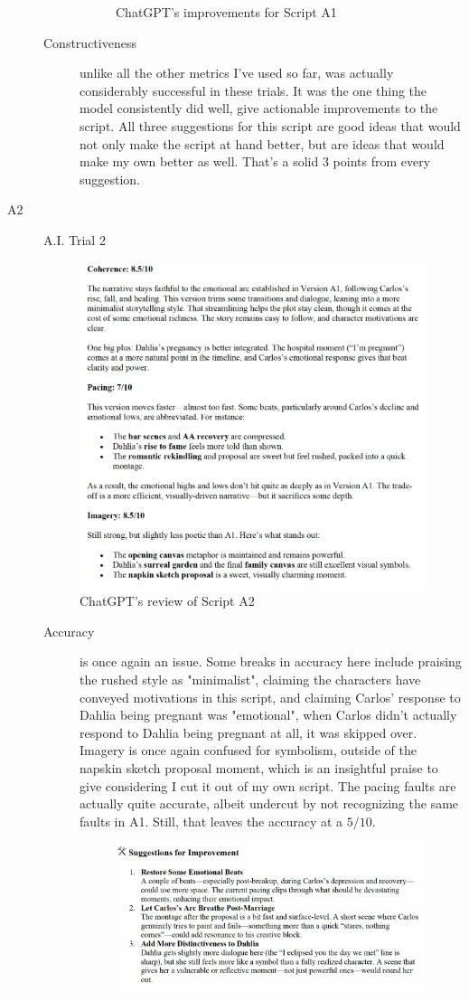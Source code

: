 \documentclass[sigconf]{acmart}
\begin{document}
\begin{description}
\begin{description}
\begin{figure}[!hbt]
            \caption{ChatGPT's improvements for Script A1}
            \label{fig:a1-improvements}
        \end{figure}
        \item[Constructiveness] unlike all the other metrics I've used so far, was actually considerably successful in these trials. It was the one thing the model consistently did well, give actionable improvements to the script. All three suggestions for this script are good ideas that would not only make the script at hand better, but are ideas that would make my own better as well. That's a solid $3$ points from every suggestion.
    \end{description}
    \item[A2] A.I. Trial 2
    \begin{figure}[!hbt]
            \centering
            \includegraphics[width=0.5\linewidth]{images/A2Metrics.png}
            \caption{ChatGPT's review of Script A2}
            \label{fig:a2-metrics}
    \end{figure}
    \begin{description}
        \item[Accuracy] is once again an issue. Some breaks in accuracy here include praising the rushed style as "minimalist", claiming the characters have conveyed motivations in this script, and claiming Carlos' response to Dahlia being pregnant was "emotional", when Carlos didn't actually respond to Dahlia being pregnant at all, it was skipped over. Imagery is once again confused for symbolism, outside of the napskin sketch proposal moment, which is an insightful praise to give considering I cut it out of my own script. The pacing faults are actually quite accurate, albeit undercut by not recognizing the same faults in A1. Still, that leaves the accuracy at a $5/10$.
        \begin{figure}[!hbt]
            \centering
            \includegraphics[width=0.8\linewidth]{images/A2Improvements.png}

\end{figure}
\end{description}
\end{description}
\end{document}
